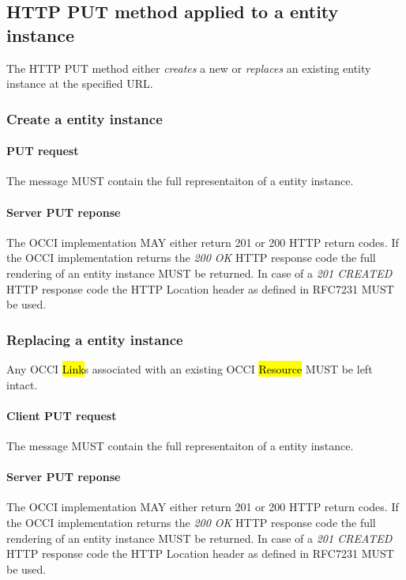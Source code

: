 \documentclass[10pt,a4paper]{article}
\begin{document}
\subsection{HTTP PUT method applied to a entity instance}
The HTTP PUT method either {\em creates} a new or {\em replaces} an existing entity instance at the specified URL.

\subsubsection{Create a entity instance}

\paragraph{PUT request}
The message MUST contain the full representaiton of a entity instance.

\paragraph{Server PUT reponse}
The OCCI implementation MAY either return 201 or 200 HTTP return codes. If the OCCI implementation
returns the \emph{200 OK} HTTP response code the full rendering of an entity instance MUST be returned. 
In case of a \emph{201 CREATED} HTTP response code the HTTP Location header as defined in RFC7231 \cite{rfc7231} MUST be used.

\subsubsection{Replacing a entity instance}
Any OCCI \hl{Link}s associated with an existing OCCI \hl{Resource} MUST be left intact.

\paragraph{Client PUT request}
The message MUST contain the full representaiton of a entity instance.

\paragraph{Server PUT reponse}
The OCCI implementation MAY either return 201 or 200 HTTP return codes. If the OCCI implementation
returns the \emph{200 OK} HTTP response code the full rendering of an entity instance MUST be returned. 
In case of a \emph{201 CREATED} HTTP response code the HTTP Location header as defined in RFC7231 \cite{rfc7231} MUST be used.
\end{document}
